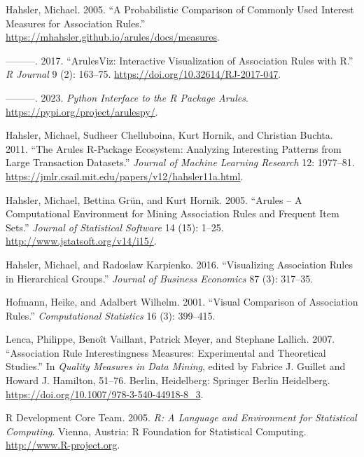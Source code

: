 \documentclass{article}
\newlength{\cslhangindent}
\newlength{\cslentryspacingunit} %
\newenvironment{CSLReferences}[2] %
 {%
  \setlength{\parindent}{0pt}
  \ifodd #1
  \let\oldpar\par
  \def\par{\hangindent=\cslhangindent\oldpar}
  \fi
  \setlength{\parskip}{#2\cslentryspacingunit}
 }%
 {}
\begin{document}
\begin{CSLReferences}{1}{0}
\leavevmode{}%
Hahsler, Michael. 2005. {``A Probabilistic Comparison of Commonly Used
Interest Measures for Association Rules.''}
\url{https://mhahsler.github.io/arules/docs/measures}.

\leavevmode{}%
---------. 2017. {``Arules{V}iz: {I}nteractive Visualization of
Association Rules with {R}.''} \emph{R Journal} 9 (2): 163--75.
\url{https://doi.org/10.32614/RJ-2017-047}.

\leavevmode{}%
---------. 2023. \emph{Python Interface to the {R} Package Arules}.
\url{https://pypi.org/project/arulespy/}.

\leavevmode{}%
Hahsler, Michael, Sudheer Chelluboina, Kurt Hornik, and Christian
Buchta. 2011. {``The Arules {R}-Package Ecosystem: {A}nalyzing
Interesting Patterns from Large Transaction Datasets.''} \emph{Journal
of Machine Learning Research} 12: 1977--81.
\url{https://jmlr.csail.mit.edu/papers/v12/hahsler11a.html}.

\leavevmode{}%
Hahsler, Michael, Bettina Grün, and Kurt Hornik. 2005. {``Arules -- {A}
Computational Environment for Mining Association Rules and Frequent Item
Sets.''} \emph{Journal of Statistical Software} 14 (15): 1--25.
\url{http://www.jstatsoft.org/v14/i15/}.

\leavevmode{}%
Hahsler, Michael, and Radoslaw Karpienko. 2016. {``Visualizing
Association Rules in Hierarchical Groups.''} \emph{Journal of Business
Economics} 87 (3): 317--35.

\leavevmode{}%
Hofmann, Heike, and Adalbert Wilhelm. 2001. {``Visual Comparison of
Association Rules.''} \emph{Computational Statistics} 16 (3): 399--415.

\leavevmode{}%
Lenca, Philippe, Benoît Vaillant, Patrick Meyer, and Stephane Lallich.
2007. {``Association Rule Interestingness Measures: Experimental and
Theoretical Studies.''} In \emph{Quality Measures in Data Mining},
edited by Fabrice J. Guillet and Howard J. Hamilton, 51--76. Berlin,
Heidelberg: Springer Berlin Heidelberg.
\url{https://doi.org/10.1007/978-3-540-44918-8_3}.

\leavevmode{}%
R Development Core Team. 2005. \emph{R: A Language and Environment for
Statistical Computing}. Vienna, Austria: R Foundation for Statistical
Computing. \url{http://www.R-project.org}.


\end{CSLReferences}
\end{document}
